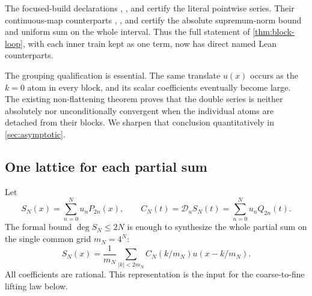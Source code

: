 \documentclass[11pt,oneside]{article}
\numberwithin{equation}{section}
\theoremstyle{definition}
\theoremstyle{remark}
\newcommand{\Dscr}{\mathscr D_u}
\begin{document}
The focused-build declarations
,
, and
 certify the literal pointwise
series.  Their continuous-map counterparts
,
, and
 certify the absolute
supremum-norm bound and uniform sum on the whole interval.  Thus the full
statement of \cref{thm:block-loop}, with each inner train kept as one term, now
has direct named Lean counterparts.

The grouping qualification is essential.  The same translate $u(x)$ occurs as
the $k=0$ atom in every block, and its scalar coefficients eventually become
large.  The existing non-flattening theorem proves that the double series is
neither absolutely nor unconditionally convergent when the individual atoms
are detached from their blocks.  We sharpen that conclusion quantitatively in
\cref{sec:asymptotic}.

\subsection{One lattice for each partial sum}

Let
\begin{equation}
 S_N(x)=\sum_{n=0}^{N}u_nP_{2n}(x),
 \qquad
 C_N(t)=\Dscr S_N(t)=\sum_{n=0}^{N}u_nQ_{2n}(t).
 \label{eq:SN-CN}
\end{equation}
The formal bound $\deg S_N\le2N$ is enough to synthesize the whole partial sum
on the single common grid $m_N=4^N$:
\begin{equation}
 \boxed{
 S_N(x)=\frac1{m_N}\sum_{|k|<2m_N}
 C_N(k/m_N)u(x-k/m_N).}
 \label{eq:fixed-scale}
\end{equation}
All coefficients are rational.  This representation is the input for the
coarse-to-fine lifting law below.
\end{document}
